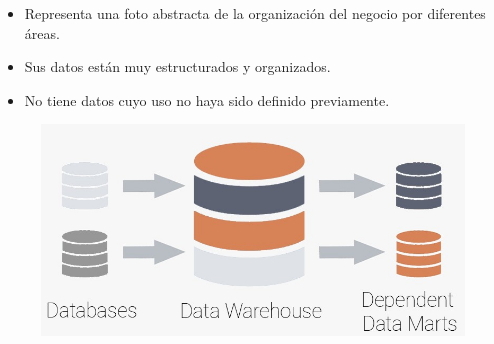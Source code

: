 \documentclass[preprint,12pt]{elsarticle}
\begin{document}
\begin{itemize}

\item Representa una foto abstracta de la organización del negocio por diferentes áreas.
\item Sus datos están muy estructurados y organizados.
\item No tiene datos cuyo uso no haya sido definido previamente.

\end{itemize}

\begin{figure}[htb]
				\begin{center}
					\includegraphics[width=15cm]{./IMAGENES/fiorella1}
				\end{center}
			\end{figure}
\end{document}
